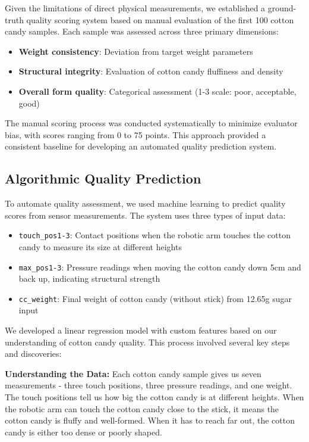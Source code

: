 Given the limitations of direct physical measurements, we established a ground-truth quality scoring system based on manual evaluation of the first 100 cotton candy samples. Each sample was assessed across three primary dimensions:

\begin{itemize}
    \item \textbf{Weight consistency}: Deviation from target weight parameters
    \item \textbf{Structural integrity}: Evaluation of cotton candy fluffiness and density
    \item \textbf{Overall form quality}: Categorical assessment (1-3 scale: poor, acceptable, good)
\end{itemize}

The manual scoring process was conducted systematically to minimize evaluator bias, with scores ranging from 0 to 75 points. This approach provided a consistent baseline for developing an automated quality prediction system.

\subsection{Algorithmic Quality Prediction}

To automate quality assessment, we used machine learning to predict quality scores from sensor measurements. The system uses three types of input data:

\begin{itemize}
    \item \texttt{touch\_pos1-3}: Contact positions when the robotic arm touches the cotton candy to measure its size at different heights
    \item \texttt{max\_pos1-3}: Pressure readings when moving the cotton candy down 5cm and back up, indicating structural strength
    \item \texttt{cc\_weight}: Final weight of cotton candy (without stick) from 12.65g sugar input
\end{itemize}

We developed a linear regression model with custom features based on our understanding of cotton candy quality. This process involved several key steps and discoveries:

\textbf{Understanding the Data:} Each cotton candy sample gives us seven measurements - three touch positions, three pressure readings, and one weight. The touch positions tell us how big the cotton candy is at different heights. When the robotic arm can touch the cotton candy close to the stick, it means the cotton candy is fluffy and well-formed. When it has to reach far out, the cotton candy is either too dense or poorly shaped.

